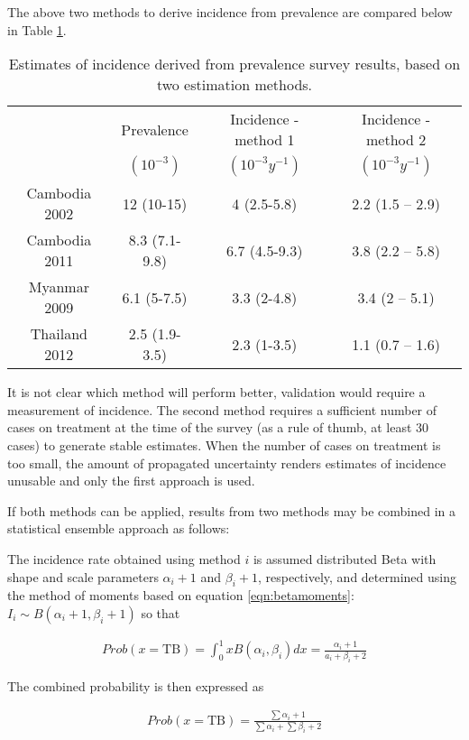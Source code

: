 The above two methods to derive incidence from prevalence are compared below in Table \ref{tab:2methods}.

\begin{table} 
    \begin{tabular}{ c c c c }
    \hline
         & Prevalence & Incidence - method 1 & Incidence - method 2 \\ 
         & $(10^{-3})$  & $(10^{-3} y^{-1})$     & $(10^{-3} y^{-1})$ \\
    \hline
        Cambodia 2002 & 12 (10-15) & 4 (2.5-5.8) & 2.2 (1.5 – 2.9) \\ 
        Cambodia 2011 & 8.3 (7.1-9.8) & 6.7 (4.5-9.3) & 3.8 (2.2 – 5.8) \\ 
        Myanmar 2009 & 6.1 (5-7.5) & 3.3 (2-4.8) & 3.4 (2 – 5.1) \\ 
        Thailand 2012 & 2.5 (1.9-3.5) & 2.3 (1-3.5) & 1.1 (0.7 – 1.6) \\ 
    \hline
    \end{tabular} 
    \caption{Estimates of incidence derived from prevalence survey results, based on two estimation methods.} 
    \label{tab:2methods}
\end{table}

It is not clear which method will perform better, validation would require a measurement of incidence. The second method requires a sufficient number of cases on treatment at the time of the survey (as a rule of thumb, at least 30 cases) to generate stable estimates. When the number of cases on treatment is too small, the amount of propagated uncertainty renders estimates of incidence unusable and only the first approach is used. 

If both methods can be applied, results from two methods may be combined in a statistical ensemble approach as follows:

The incidence rate obtained using method $i$ is assumed distributed Beta with shape and scale parameters $\alpha_i + 1$ and $\beta_i + 1$, respectively, and determined using the method of moments based on equation \ref{eqn:betamoments}: $I_i \sim B(\alpha_i + 1, \beta_i + 1)$ so that 

\begin{align*}
Prob(x = \textrm{TB})= \int_{0}^{1} x B(\alpha_i, \beta_i) dx = \frac{\alpha_i+1}{a_i+\beta_i+2}
\end{align*}

The combined probability is then expressed as 

\begin{align*}
Prob(x = \textrm{TB}) = \frac{\sum{\alpha_i}+1}{\sum{\alpha_i}+\sum{\beta_i}+2} 
\end{align*}


